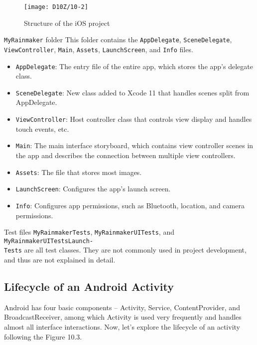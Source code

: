\documentclass[a4paper,12pt]{book}
\begin{document}
\begin{figure}[ht]
    \centering
    \texttt{[image: D10Z/10-2]}
    \caption{Structure of the iOS project}
\end{figure}

\begin{term}{\texttt{MyRainmaker} folder}
    This folder contains the \verb|AppDelegate|, \verb|SceneDelegate|, \verb|ViewController|, \verb|Main|, \verb|Assets|, \verb|LaunchScreen|, and \verb|Info| files.
    \vspace{6pt}
    \begin{itemize}
        \item \verb|AppDelegate|: The entry file of the entire app, which stores the app’s delegate class.
        \item \verb|SceneDelegate|: New class added to Xcode 11 that handles scenes split from AppDelegate.
        \item \verb|ViewController|: Host controller class that controls view display and handles touch events, etc.
        \item \verb|Main|: The main interface storyboard, which contains view controller scenes in the app and describes the connection between multiple view controllers.
        \item \verb|Assets|: The file that stores most images.
        \item \verb|LaunchScreen|: Configures the app’s launch screen.
        \item \verb|Info|: Configures app permissions, such as Bluetooth, location, and camera permissions.
    \end{itemize}
\end{term}

\begin{term}{Test files}
    \verb|MyRainmakerTests|, \verb|MyRainmakerUITests|, and \verb|MyRainmakerUITestsLaunch-|\\
    \verb|Tests| are all test classes. They are not commonly used in project development, and thus are not explained in detail.
\end{term}

\subsection{Lifecycle of an Android Activity}
Android has four basic components – Activity, Service, ContentProvider, and BroadcastReceiver, among which Activity is used very frequently and handles almost all interface interactions. Now, let’s explore the lifecycle of an activity following the Figure 10.3.
\end{document}

